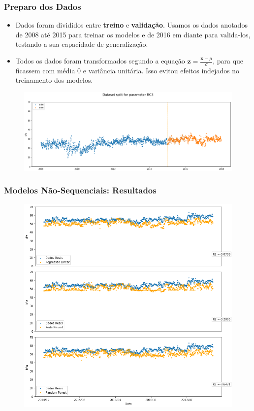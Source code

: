\documentclass{beamer}
\begin{document}
\begin{frame}
  \frametitle{Preparo dos Dados}
  \begin{itemize}
    \item Dados foram divididos entre \textbf{treino} e \textbf{validação}.
      Usamos os dados anotados de 2008 até 2015 para treinar os modelos e de
      2016 em diante para valida-los, testando a sua capacidade de
      generalização.
      
    \item Todos os dados foram transformados segundo a equação $\textbf{z} =
      \frac{\textbf{x} - \mu}{\sigma}$, para que ficassem com média 0 e
      variância unitária. Isso evitou efeitos indejados no treinamento dos modelos.
      
    \end{itemize}
    \begin{figure}[H]
  \centering
  \includegraphics[width=0.9\columnwidth]{split_2008-2015-2017RC3.png}
\end{figure}

\end{frame}


\begin{frame}
\frametitle{Modelos Não-Sequenciais: Resultados}  
\begin{figure}[H]
\centering
\includegraphics[scale=0.3]{exped_saco_2008-2012-2014RC28.png}
\end{figure}
\end{frame}
\end{document}
